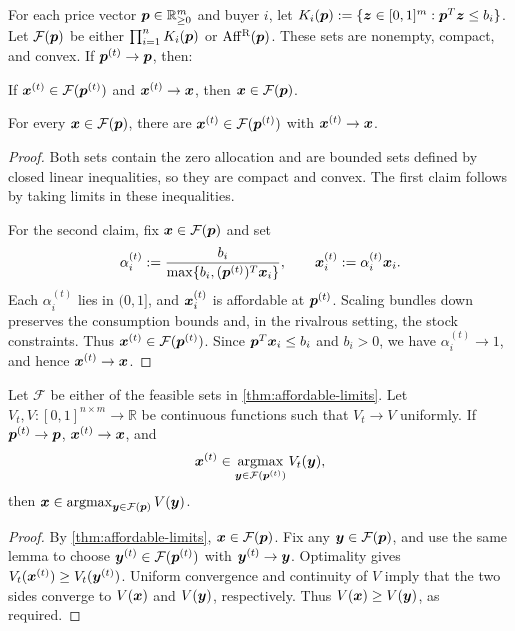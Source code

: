 \begin{lemma}
\label{thm:affordable-limits}
For each price vector $\bm{p} \in \mathbb{R}_{\ge 0}^m$ and buyer $i$, let
$K_i(\bm{p}) := \{\bm{z} \in [0, 1]^m: \bm{p}^T\bm{z} \le b_i\}$.
Let $\mathcal{F}(\bm{p})$ be either $\prod_{i=1}^n K_i(\bm{p})$ or $\operatorname{Aff^{\mathrm{R}}}(\bm{p})$.
These sets are nonempty, compact, and convex.
If $\bm{p}^{(t)} \to \bm{p}$, then:
\begin{tightenum}
\item If $\bm{x}^{(t)} \in \mathcal{F}(\bm{p}^{(t)})$ and $\bm{x}^{(t)} \to \bm{x}$,
    then $\bm{x} \in \mathcal{F}(\bm{p})$.
\item For every $\bm{x} \in \mathcal{F}(\bm{p})$, there are
    $\bm{x}^{(t)} \in \mathcal{F}(\bm{p}^{(t)})$ with $\bm{x}^{(t)} \to \bm{x}$.
\end{tightenum}
\end{lemma}
\begin{proof}
Both sets contain the zero allocation and are bounded sets defined by closed linear inequalities,
so they are compact and convex.
The first claim follows by taking limits in these inequalities.

For the second claim, fix $\bm{x} \in \mathcal{F}(\bm{p})$ and set
\[ \alpha_i^{(t)} :=
    \frac{b_i}{\max\{b_i, (\bm{p}^{(t)})^T\bm{x}_i\}},
    \qquad \bm{x}_i^{(t)} := \alpha_i^{(t)}\bm{x}_i. \]
Each $\alpha_i^{(t)}$ lies in $(0, 1]$, and $\bm{x}_i^{(t)}$ is affordable at $\bm{p}^{(t)}$.
Scaling bundles down preserves the consumption bounds and, in the rivalrous setting,
the stock constraints. Thus $\bm{x}^{(t)} \in \mathcal{F}(\bm{p}^{(t)})$.
Since $\bm{p}^T\bm{x}_i \le b_i$ and $b_i > 0$, we have $\alpha_i^{(t)} \to 1$,
and hence $\bm{x}^{(t)} \to \bm{x}$.
\end{proof}

\begin{lemma}
\label{thm:maximizer-limits}
Let $\mathcal{F}$ be either of the feasible sets in \cref{thm:affordable-limits}.
Let $V_t, V: [0, 1]^{n \times m} \to \mathbb{R}$ be continuous functions such that
$V_t \to V$ uniformly.
If $\bm{p}^{(t)} \to \bm{p}$, $\bm{x}^{(t)} \to \bm{x}$, and
\[ \bm{x}^{(t)} \in \operatorname*{argmax}_{\bm{y} \in \mathcal{F}(\bm{p}^{(t)})} V_t(\bm{y}), \]
then $\bm{x} \in \operatorname*{argmax}_{\bm{y} \in \mathcal{F}(\bm{p})} V(\bm{y})$.
\end{lemma}
\begin{proof}
By \cref{thm:affordable-limits}, $\bm{x} \in \mathcal{F}(\bm{p})$.
Fix any $\bm{y} \in \mathcal{F}(\bm{p})$, and use the same lemma to choose
$\bm{y}^{(t)} \in \mathcal{F}(\bm{p}^{(t)})$ with $\bm{y}^{(t)} \to \bm{y}$.
Optimality gives $V_t(\bm{x}^{(t)}) \ge V_t(\bm{y}^{(t)})$.
Uniform convergence and continuity of $V$ imply that the two sides converge to
$V(\bm{x})$ and $V(\bm{y})$, respectively.
Thus $V(\bm{x}) \ge V(\bm{y})$, as required.
\end{proof}

